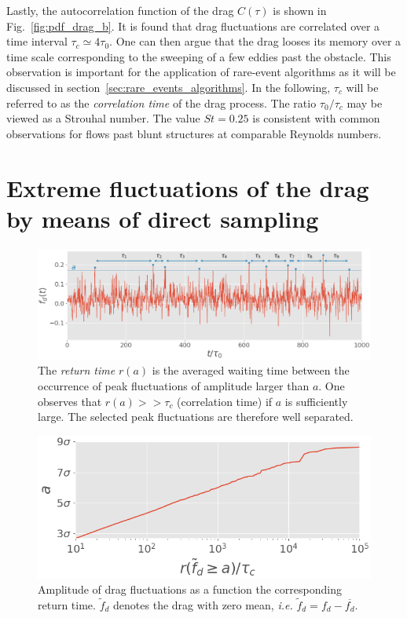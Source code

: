 \documentclass[pre,aps,floatfix,10pt,superscriptaddress, notitlepage,preprint]{revtex4-1}
\begin{document}
Lastly, the autocorrelation function of the drag $C(\tau)$ is shown in Fig.~\ref{fig:pdf_drag_b}. It is found that drag fluctuations are correlated over a time interval $\tau_c \simeq 4\tau_0$. One can then argue that the drag looses its memory  over a time scale corresponding to the sweeping of a few eddies past the obstacle.
%
This observation is important for the application of rare-event algorithms as it will be discussed in section~\ref{sec:rare_events_algorithms}.
%
In the following, $\tau_c$ will be referred to as the \textit{correlation time} of the drag process.
The ratio $\tau_0 / \tau_c$ may be viewed as a {Strouhal number}. The value $St=0.25$ is consistent with common observations for flows past blunt structures at comparable Reynolds numbers.

\section{Extreme fluctuations of the drag by means of direct sampling}
\label{sec:direct_sampling}

\begin{figure}
	\centering
	\includegraphics[width=\linewidth]{illustrate_return_time/illustrate_return_time}
	\caption{\label{fig:illustrate_return_time} {The \textit{return time} $r(a)$  is the averaged waiting time between the occurrence of peak fluctuations of amplitude larger than $a$.
	One observes that $r(a) >> \tau_c$ (correlation time) if $a$ is sufficiently large. The selected peak fluctuations are therefore well separated.}
	}
\end{figure}

\begin{figure}
	\centering
	\includegraphics[width=.6\linewidth]{return_time/return_time.png}
	\caption{Amplitude of drag fluctuations as a function the corresponding return time. $\tilde{f}_d$ denotes the drag with zero mean, \textit{i.e.} $\tilde{f}_d = f_d - \overline{f_d}$.
	}
	\label{fig:return_time_instant}
\end{figure}
\end{document}
